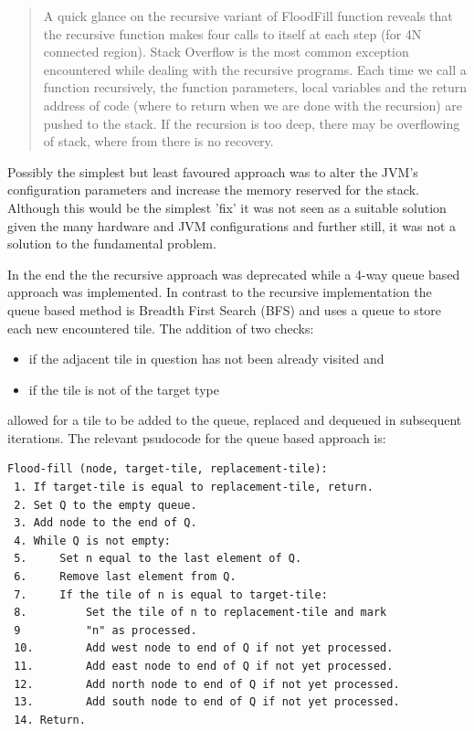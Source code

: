  \begin{quotation}
A quick glance on the recursive variant of FloodFill function reveals that the recursive function makes four calls to itself at each step (for 4N connected region). Stack Overflow is the most common exception encountered while dealing with the recursive programs. Each time we call a function recursively, the function parameters, local variables and the return address of code (where to return when we are done with the recursion) are pushed to the stack. If the recursion is too deep, there may be overflowing of stack, where from there is no recovery.
 \end{quotation}
 
Possibly the simplest but least favoured approach was to alter the JVM's configuration parameters and increase the memory reserved for the stack.  Although this would be the simplest 'fix' it was not seen as a suitable solution given the many hardware and JVM configurations and further still, it was not a solution to the fundamental problem.

In the end the the recursive approach was deprecated while a 4-way queue based approach was implemented.  In contrast to the recursive implementation the queue based method is Breadth First Search (BFS) and uses a queue to store each new encountered tile.  The addition of two checks:

\begin{itemize}
  \item if the adjacent tile in question has not been already visited and
  \item if the tile is not of the target type
\end{itemize}

allowed for a tile to be added to the queue, replaced and dequeued in subsequent iterations. The relevant psudocode for the queue based approach is:

\begin{minipage}{0.9\textwidth}
	\begin{lstlisting}[caption={4-way queue based flood fill}, label={lst:queueFloodFill}]
Flood-fill (node, target-tile, replacement-tile):
 1. If target-tile is equal to replacement-tile, return.
 2. Set Q to the empty queue.
 3. Add node to the end of Q.
 4. While Q is not empty: 
 5.     Set n equal to the last element of Q.
 6.     Remove last element from Q.
 7.     If the tile of n is equal to target-tile:
 8.         Set the tile of n to replacement-tile and mark 
 9			"n" as processed.
 10.        Add west node to end of Q if not yet processed.
 11.        Add east node to end of Q if not yet processed.
 12.        Add north node to end of Q if not yet processed.
 13.        Add south node to end of Q if not yet processed.
 14. Return.
	\end{lstlisting}
\end{minipage}

